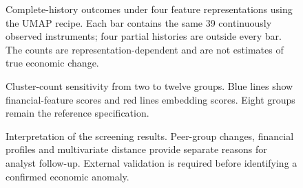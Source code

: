 \clearpage
\begin{figure}[p]
\centering
{}
\caption{Complete-history outcomes under four feature representations using the UMAP recipe. Each bar contains the same 39 continuously observed instruments; four partial histories are outside every bar. The counts are representation-dependent and are not estimates of true economic change.}\end{figure}
\clearpage
\begin{figure}[p]
\centering
{}
\caption{Cluster-count sensitivity from two to twelve groups. Blue lines show financial-feature scores and red lines embedding scores. Eight groups remain the reference specification.}\end{figure}
\clearpage
\begin{figure}[p]
\centering
{}
\caption{Interpretation of the screening results. Peer-group changes, financial profiles and multivariate distance provide separate reasons for analyst follow-up. External validation is required before identifying a confirmed economic anomaly.}\end{figure}

